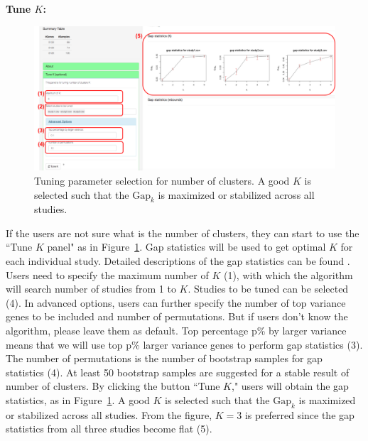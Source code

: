 \begin{steps}

\item \textbf{Tune $K$:} 

\begin{figure}[H]
\begin{center}
\includegraphics[scale=0.5]{./figure/metaClust/tuneK.pdf}
\caption{Tuning parameter selection for number of clusters.
A good $K$ is selected such that the $\mbox{Gap}_k$ is maximized or stabilized across all studies.
}
\label{fig:metaClusttuneK}
\end{center}
\end{figure}

If the users are not sure what is the number of clusters,
they can start to use the ``Tune $K$ panel" as in Figure~\ref{fig:metaClusttuneK}.
Gap statistics will be used to get optimal $K$ for each individual study.
Detailed descriptions of the gap statistics can be found \cite{tibshirani2001estimating}.
Users need to specify the maximum number of $K$ {\color{red} (1)}, 
with which the algorithm will search number of studies from 1 to $K$.
Studies to be tuned can be selected {\color{red} (4)}.
In advanced options, users can further specify the number of top variance genes to be included and number of permutations.
But if users don't know the algorithm, please leave them as default.
Top percentage p\% by larger variance means that we will use top p\% larger variance genes to perform gap statistics {\color{red} (3)}.
The number of permutations is the number of bootstrap samples for gap statistics {\color{red} (4)}.
At least 50 bootstrap samples are suggested for a stable result of number of clusters.
By clicking the button ``Tune $K$,"
users will obtain the gap statistics, 
as in Figure~\ref{fig:metaClusttuneK}.
A good $K$ is selected such that the $\mbox{Gap}_k$ is maximized or stabilized across all studies.
From the figure, $K=3$ is preferred since the gap statistics from all three studies become flat {\color{red} (5)}.


\end{steps}
